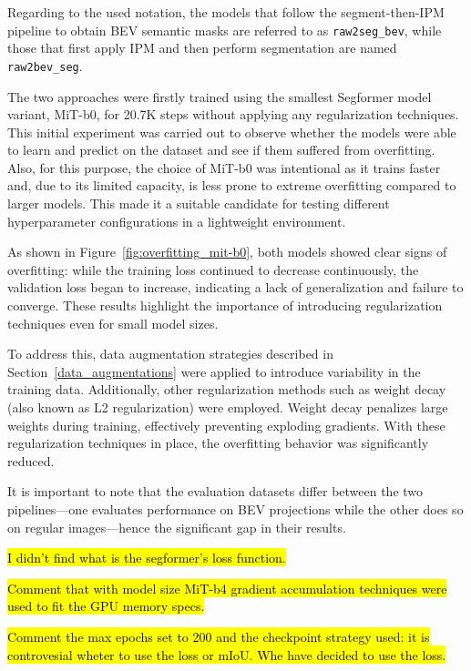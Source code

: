 Regarding to the used notation, the models that follow the segment-then-IPM pipeline to obtain BEV semantic masks are referred to as \texttt{raw2seg\_bev}, while those that first apply IPM and then perform segmentation are named \texttt{raw2bev\_seg}.


The two approaches were firstly trained using the smallest Segformer model variant, MiT-b0, for 20.7K steps without applying any regularization techniques. This initial experiment was carried out to observe whether the models were able to learn and predict on the dataset and see if them suffered from overfitting. Also, for this purpose, the choice of MiT-b0 was intentional as it trains faster and, due to its limited capacity, is less prone to extreme overfitting compared to larger models. This made it a suitable candidate for testing different hyperparameter configurations in a lightweight environment.

As shown in Figure~\ref{fig:overfitting_mit-b0}, both models showed clear signs of overfitting: while the training loss continued to decrease continuously, the validation loss began to increase, indicating a lack of generalization and failure to converge. These results highlight the importance of introducing regularization techniques even for small model sizes.

To address this, data augmentation strategies described in Section~\ref{data_augmentations} were applied to introduce variability in the training data. Additionally, other regularization methods such as weight decay (also known as L2 regularization) were employed. Weight decay penalizes large weights during training, effectively preventing exploding gradients. With these regularization techniques in place, the overfitting behavior was significantly reduced.

It is important to note that the evaluation datasets differ between the two pipelines—one evaluates performance on BEV projections while the other does so on regular images—hence the significant gap in their results.


\hl{I didn't find what is the segformer's loss function.}

\hl{Comment that with model size MiT-b4 gradient accumulation techniques were used to fit the GPU memory specs.}

\hl{Comment the max epochs set to 200 and the checkpoint strategy used: it is controvesial wheter to use the loss or mIoU. Whe have decided to use the loss.}



